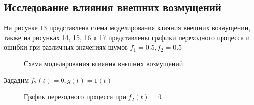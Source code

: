 \documentclass[a4paper, 11pt]{article}
\begin{document}
\newpage

\begin{center}
\section{Исследование влияния внешних возмущений}
\end{center}
На рисунке 13 представлена схема моделирования влияния внешних возмущений, также на рисунках 14, 15, 16 и 17 представлены графики переходного процесса и ошибки при различных значениях шумов $f_1=0.5,  f_2=0.5$

\begin{figure}[h!]
    \caption{Схема моделирования влияния внешних возмущений}
    \label{tree}
\end{figure}

Зададим $f_2(t) = 0, g(t) = 1(t)$

\begin{figure}[h!]
    \caption{График переходного процесса при $f_2(t) = 0$}
    \label{two}
\end{figure}

\newpage
\end{document}
